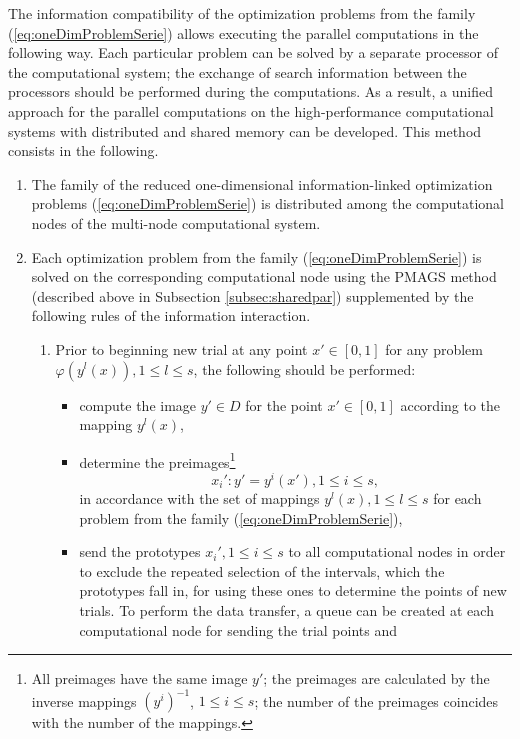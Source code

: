 \documentclass{aims}
\theoremstyle{definition}
\begin{document}
The information compatibility of the optimization problems from the family (\ref{eq:oneDimProblemSerie})
allows executing the parallel computations in the following way. Each particular
problem can be solved by a separate processor of the computational system; the exchange
of search information between the processors should be performed during the computations.
As a result, a unified approach for the parallel computations on the high-performance
computational systems with distributed and shared memory can be developed. This method consists in the following.
\begin{enumerate}
  \item The family of the reduced one-dimensional information-linked optimization
  problems (\ref{eq:oneDimProblemSerie}) is distributed among the computational nodes of the multi-node computational system.
  \item Each optimization problem from the family (\ref{eq:oneDimProblemSerie}) is solved on the
  corresponding computational node using the PMAGS method (described above in Subsection \ref{subsec:sharedpar})
  supplemented by the following rules of the information interaction.
  \begin{enumerate}
    \item Prior to beginning new trial at any point \(x'\in [0,1]\) for any problem \(\varphi(y^l(x)),1\leq l\leq s\), the following should be performed:
    \begin{itemize}
      \item compute the image \(y'\in D\) for the point \(x'\in [0, 1]\) according to the mapping \(y^l(x)\),
      \item determine  the preimages\footnote{All preimages have the same
      image \(y'\); the preimages are calculated by the inverse mappings \((y^i)^{-1}\), \(1\le i\le s\);
      the number of the preimages coincides with the number of the mappings.}
      \begin{displaymath}
        x_i':y'=y^i(x'),1\le i\le s,
      \end{displaymath}
      in accordance with the set of mappings \(y^l(x), 1\le l\le s\) for each problem from the family (\ref{eq:oneDimProblemSerie}),
      \item send the prototypes \(x_i',1\leq i\leq s\) to all computational nodes in order
      to exclude the repeated selection of the intervals, which the prototypes fall in,
      for using these ones to determine the points of new trials. To perform the data transfer,
      a queue can be created at each computational node for sending the trial points and

\end{itemize}
\end{enumerate}
\end{enumerate}
\end{document}
